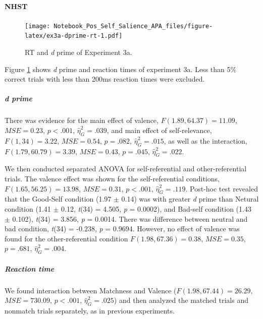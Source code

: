 \documentclass[
  english,
  man]{apa6}
\let\oldparagraph\paragraph
\renewcommand{\paragraph}[1]{\oldparagraph{#1}\mbox{}}
\let\oldsubparagraph\subparagraph
\renewcommand{\subparagraph}[1]{\oldsubparagraph{#1}\mbox{}}
\begin{document}
\hypertarget{nhst-3}{%
\paragraph{NHST}\label{nhst-3}}

\begin{figure}
\centering
\texttt{[image: Notebook\_Pos\_Self\_Salience\_APA\_files/figure-latex/ex3a-dprime-rt-1.pdf]}
\caption{\label{fig:ex3a-dprime-rt}RT and \emph{d} prime of Experiment 3a.}
\end{figure}

Figure \ref{fig:ex3a-dprime-rt} shows \emph{d} prime and reaction times of experiment 3a. Less than 5\% correct trials with less than 200ms reaction times were excluded.

\hypertarget{d-prime-3}{%
\subparagraph{d prime}\label{d-prime-3}}

There was evidence for the main effect of valence, \(F(1.89, 64.37) = 11.09\), \(\mathit{MSE} = 0.23\), \(p < .001\), \(\hat{\eta}^2_G = .039\), and main effect of self-relevance, \(F(1, 34) = 3.22\), \(\mathit{MSE} = 0.54\), \(p = .082\), \(\hat{\eta}^2_G = .015\), as well as the interaction, \(F(1.79, 60.79) = 3.39\), \(\mathit{MSE} = 0.43\), \(p = .045\), \(\hat{\eta}^2_G = .022\).

We then conducted separated ANOVA for self-referential and other-referential trials. The valence effect was shown for the self-referential conditions, \(F(1.65, 56.25) = 13.98\), \(\mathit{MSE} = 0.31\), \(p < .001\), \(\hat{\eta}^2_G = .119\). Post-hoc test revealed that the Good-Self condition (1.97 \(\pm\) 0.14) was with greater \emph{d} prime than Netural condition (1.41 \(\pm\) 0.12, \emph{t}(34) = 4.505, \emph{p} = 0.0002), and Bad-self condition (1.43 \(\pm\) 0.102), \emph{t}(34) = 3.856, \emph{p} = 0.0014. There was difference between neutral and bad condition, \emph{t}(34) = -0.238, \emph{p} = 0.9694. However, no effect of valence was found for the other-referential condition \(F(1.98, 67.36) = 0.38\), \(\mathit{MSE} = 0.35\), \(p = .681\), \(\hat{\eta}^2_G = .004\).

\hypertarget{reaction-time-4}{%
\subparagraph{Reaction time}\label{reaction-time-4}}

We found interaction between Matchness and Valence (\(F(1.98, 67.44) = 26.29\), \(\mathit{MSE} = 730.09\), \(p < .001\), \(\hat{\eta}^2_G = .025\)) and then analyzed the matched trials and nonmatch trials separately, as in previous experiments.
\end{document}
